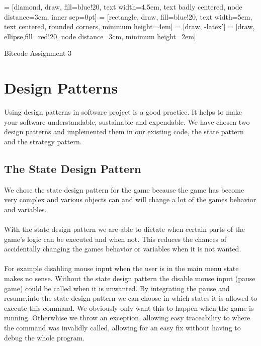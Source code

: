 \documentclass{article}
\begin{document}
 = [diamond, draw, fill=blue!20, 
    text width=4.5em, text badly centered, node distance=3cm, inner sep=0pt]
 = [rectangle, draw, fill=blue!20, 
    text width=5em, text centered, rounded corners, minimum height=4em]
 = [draw, -latex']
 = [draw, ellipse,fill=red!20, node distance=3cm,
    minimum height=2em]


\begin{titlepage}
	\Huge{Bitcode Assignment 3}
\end{titlepage}


\section{Design Patterns}
Using design patterns in software project is a good practice. It helps to make your software understandable, sustainable and expendable. We have chosen two design patterns and implemented them in our existing code, the state pattern and the strategy pattern.

\subsection{The State Design Pattern}
We chose the state design pattern for the game because the game has become very complex and various objects can and will change a lot of the games behavior and variables.
\paragraph{} With the state design pattern we are able to dictate when certain parts of the game's logic can be executed and when not. This reduces the chances of accidentally changing the games behavior or variables when it is not wanted.
\paragraph{} For example disabling mouse input when the user is in the main menu state makes no sense. Without the state design pattern the disable mouse input (pause game) could be called when it is unwanted. By integrating the pause and resume,into the state design pattern we can choose in which states it is allowed to execute this command. We obviously only want this to happen when the game is running. Otherwhise we throw an exception, allowing easy traceability to where the command was invalidly called, allowing for an easy fix without having to debug the whole program.
\end{document}
